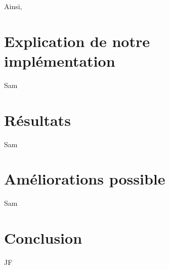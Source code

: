 \documentclass{article}
\begin{document}
Ainsi, 
\section{Explication de notre implémentation}

Sam

\section{Résultats}

Sam

\section{Améliorations possible}

Sam

\section{Conclusion}

JF

\printbibliography
\end{document}
